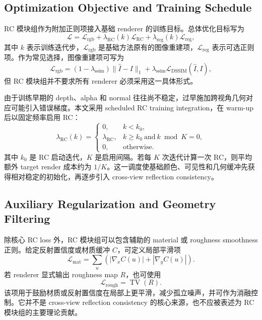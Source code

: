 \documentclass[UTF8,a4paper,11pt]{ctexart}
\begin{document}
\subsection{Optimization Objective and Training Schedule}

RC 模块组作为附加正则项接入基础 renderer 的训练目标。总体优化目标写为
\begin{equation}
\mathcal{L}=
\mathcal{L}_{\mathrm{rgb}}
+
\lambda_{\mathrm{RC}}(k)\mathcal{L}_{\mathrm{RC}}
+
\lambda_{\mathrm{reg}}(k)\mathcal{L}_{\mathrm{reg}},
\end{equation}
其中 \(k\) 表示训练迭代步，\(\mathcal{L}_{\mathrm{rgb}}\) 是基础方法原有的图像重建项，\(\mathcal{L}_{\mathrm{reg}}\) 表示可选正则项。作为常见选择，图像重建项可写为
\begin{equation}
\mathcal{L}_{\mathrm{rgb}}
=
(1-\lambda_{\mathrm{ssim}})
\|\hat{I}-I\|_1
+
\lambda_{\mathrm{ssim}}
\mathcal{L}_{\mathrm{DSSIM}}(\hat{I},I),
\end{equation}
但 RC 模块组并不要求所有 renderer 必须采用这一具体形式。

由于训练早期的 depth、alpha 和 normal 往往尚不稳定，过早施加跨视角几何对应可能引入错误梯度。本文采用 scheduled RC training integration，在 warm-up 后以固定频率启用 RC：
\begin{equation}
\lambda_{\mathrm{RC}}(k)=
\begin{cases}
0, & k<k_0,\\
\lambda_{\mathrm{RC}}, & k\ge k_0 \ \mathrm{and}\ k\bmod K=0,\\
0, & \mathrm{otherwise}.
\end{cases}
\end{equation}
其中 \(k_0\) 是 RC 启动迭代，\(K\) 是启用间隔。若每 \(K\) 次迭代计算一次 RC，则平均额外 target render 成本约为 \(1/K\)。这一调度使基础颜色、可见性和几何缓冲先获得相对稳定的初始化，再逐步引入 cross-view reflection consistency。

\subsection{Auxiliary Regularization and Geometry Filtering}

除核心 RC loss 外，RC 模块组可以包含辅助的 material 或 roughness smoothness 正则。给定反射置信度或材质缓冲 \(C\)，可定义局部平滑项
\begin{equation}
\mathcal{L}_{\mathrm{mat}}=
\sum_{u}
\left(
|\nabla_x C(u)|+|\nabla_y C(u)|
\right).
\end{equation}
若 renderer 显式输出 roughness map \(R\)，也可使用
\begin{equation}
\mathcal{L}_{\mathrm{rough}}=\operatorname{TV}(R).
\end{equation}
该项用于鼓励材质或反射置信度在局部上更平滑，减少孤立噪声，并可作为消融控制。它并不是 cross-view reflection consistency 的核心来源，也不应被表述为 RC 模块组的主要理论贡献。
\end{document}
